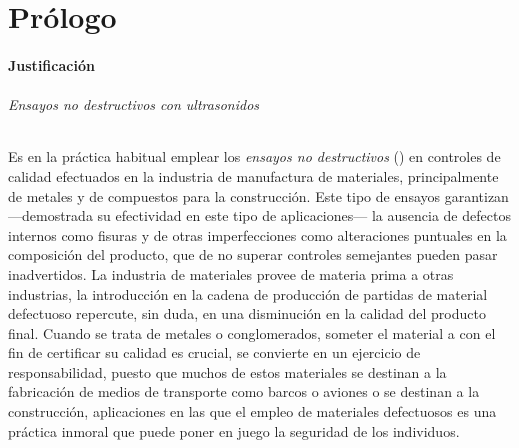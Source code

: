 \chapter{Prólogo}

\subsubsection{Justificación}

\subparagraph{Ensayos no destructivos con ultrasonidos}

Es en la práctica habitual emplear los \emph{ensayos no destructivos} () en controles de calidad efectuados en la industria de manufactura de materiales, principalmente de metales y de compuestos para la construcción. Este tipo de ensayos garantizan ---demostrada su efectividad en este tipo de aplicaciones--- la ausencia de defectos internos como fisuras y de otras imperfecciones como alteraciones puntuales en la composición del producto, que de no superar controles semejantes pueden pasar inadvertidos. La industria de materiales provee de materia prima a otras industrias, la introducción en la cadena de producción de partidas de material defectuoso repercute, sin duda, en una disminución en la calidad del producto final. Cuando se trata de metales o conglomerados, someter el material a  con el fin de certificar su calidad es crucial, se convierte en un ejercicio de responsabilidad, puesto que muchos de estos materiales se destinan a la fabricación de medios de transporte como barcos o aviones o se destinan a la construcción, aplicaciones en las que el empleo de materiales defectuosos es una práctica inmoral que puede poner en juego la seguridad de los individuos.\par %
